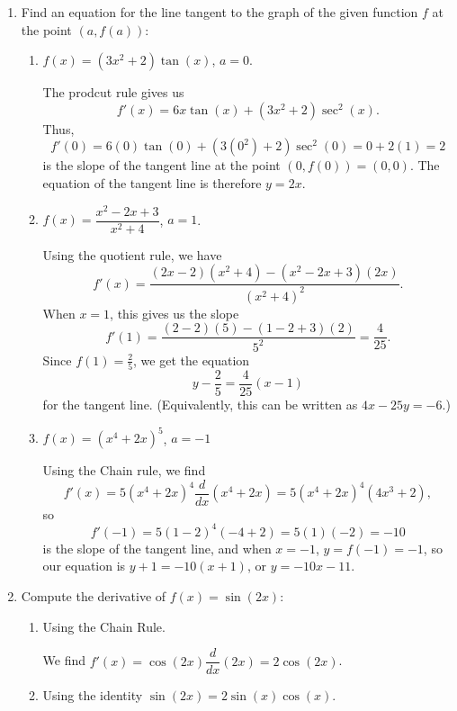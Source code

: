 \documentclass[12pt]{article}
\begin{document}
\thispagestyle{fancy}

 \begin{enumerate}
 \item  Find an equation for the line tangent to the graph of the given function $f$ at the point $(a,f(a))$:
\begin{enumerate}
 \item $f(x) = (3x^2+2)\tan(x)$, $a=0$.

\bigskip

The prodcut rule gives us
\[
 f'(x) = 6x\tan(x)+(3x^2+2)\sec^2(x).
\]
Thus, 
\[
 f'(0) = 6(0)\tan(0)+(3(0^2)+2)\sec^2(0) = 0+2(1) = 2
\]
 is the slope of the tangent line at the point $(0,f(0)) = (0,0)$. The equation of the tangent line is therefore $y=2x$.

\bigskip

 \item $f(x) = \dfrac{x^2-2x+3}{x^2+4}$, $a=1$.

\bigskip

Using the quotient rule, we have
\[
 f'(x) = \frac{(2x-2)(x^2+4)-(x^2-2x+3)(2x)}{(x^2+4)^2}.
\]
When $x=1$, this gives us the slope 
\[
 f'(1) = \frac{(2-2)(5)-(1-2+3)(2)}{5^2} = \frac{4}{25}.
\]
 Since $f(1) = \frac{2}{5}$, we get the equation
\[
 y-\frac{2}{5} = \frac{4}{25}(x-1)
\]
for the tangent line. (Equivalently, this can be written as $4x-25y=-6$.)

\bigskip


 \item $f(x) = (x^4+2x)^5$, $a=-1$ 

\bigskip

Using the Chain rule, we find 
\[
 f'(x) = 5(x^4+2x)^4\frac{d}{dx}(x^4+2x) = 5(x^4+2x)^4(4x^3+2),
\]
 so 
\[
 f'(-1) = 5(1-2)^4(-4+2) = 5(1)(-2)=-10
\]
 is the slope of the tangent line, and when $x=-1$, $y=f(-1)=-1$, so our equation is $y+1=-10(x+1)$, or $y=-10x-11$.
\end{enumerate}
\newpage

\item Compute the derivative of $f(x)=\sin(2x)$:
\begin{enumerate}
 \item Using the Chain Rule.

\medskip

We find $f'(x) = \cos(2x)\dfrac{d}{dx}(2x) = 2\cos(2x)$.

\medskip

 \item Using the identity $\sin(2x)=2\sin(x)\cos(x)$.


\end{enumerate}
\end{enumerate}
\end{document}
